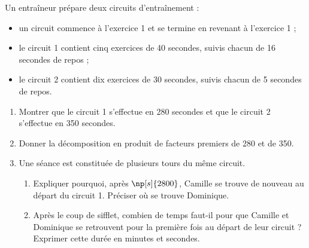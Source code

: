 \documentclass[exercice,a4]{thedocument}%
\begin{document}
%
Un entraîneur prépare deux circuits d'entraînement :
\begin{itemize}[label=\textbullet]
    \item un circuit commence à l'exercice 1 et se termine en revenant à
    l'exercice 1 ;
    \item le circuit 1 contient cinq exercices de 40 secondes, suivis chacun
    de 16 secondes de repos ;
    \item le circuit 2 contient dix exercices de 30 secondes, suivis chacun
    de 5 secondes de repos.
\end{itemize}

\begin{center}
\hspace{20pt}
\end{center}

\begin{enumerate}
    \item Montrer que le circuit 1 s'effectue en 280 secondes et que le
    circuit 2 s'effectue en 350 secondes.
    \item Donner la décomposition en produit de facteurs premiers de 280 et
    de 350.
    \item Une séance est constituée de plusieurs tours du même circuit.
    \begin{enumerate}
        \item Expliquer pourquoi, après $\np[s]{2800}$, Camille se trouve de
        nouveau au départ du circuit 1. Préciser où se trouve Dominique.
        \item Après le coup de sifflet, combien de temps faut-il pour que
        Camille et Dominique se retrouvent pour la première fois au départ de
        leur circuit ? Exprimer cette durée en minutes et secondes.
    \end{enumerate}
\end{enumerate}
\showthesource
\end{document}

